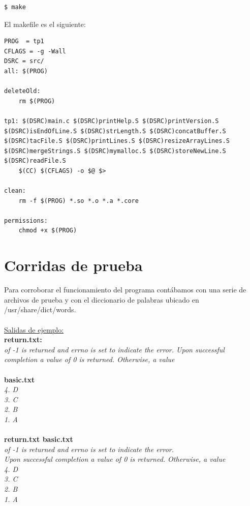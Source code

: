 \documentclass[a4paper,11pt]{article}
\begin{document}
\lstset{language=bash, breaklines=true, basicstyle=\normalsize}
\begin{lstlisting}
$ make
\end{lstlisting}

El makefile es el siguiente:
\begin{lstlisting}
PROG  = tp1
CFLAGS = -g -Wall
DSRC = src/
all: $(PROG)

deleteOld:
	rm $(PROG)

tp1: $(DSRC)main.c $(DSRC)printHelp.S $(DSRC)printVersion.S $(DSRC)isEndOfLine.S $(DSRC)strLength.S $(DSRC)concatBuffer.S $(DSRC)tacFile.S $(DSRC)printLines.S $(DSRC)resizeArrayLines.S  $(DSRC)mergeStrings.S $(DSRC)mymalloc.S $(DSRC)storeNewLine.S $(DSRC)readFile.S
	$(CC) $(CFLAGS) -o $@ $>

clean:
	rm -f $(PROG) *.so *.o *.a *.core
	
permissions:
	chmod +x $(PROG)

\end{lstlisting}


\section{Corridas de prueba}
Para corroborar el funcionamiento del programa cont\'abamos con una serie de archivos de prueba y con el diccionario de palabras ubicado en /usr/share/dict/words. 
\\
\\
\underline{Salidas de ejemplo:}\\
\textbf{return.txt:}\\
\emph{of -1 is returned and errno is set to indicate the error.
Upon successful completion a value of 0 is returned. Otherwise, a value}
\\\\
\textbf{basic.txt}\\
\emph{4. D\\
3. C\\
2. B\\
1. A\\}\\
\textbf{return.txt basic.txt}\\
\emph{of -1 is returned and errno is set to indicate the error.\\
Upon successful completion a value of 0 is returned. Otherwise, a value\\
4. D\\
3. C\\
2. B\\
1. A}\\
\end{document}
